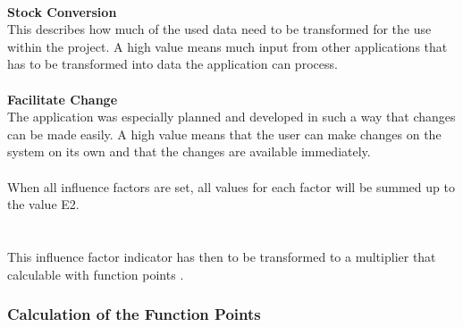 \\
\textbf{Stock Conversion}\\
This describes how much of the used data need to be transformed for the use within the project. A high value means much input from other applications that has to be transformed into data the application can process.\\
\\
\textbf{Facilitate Change}\\
The application was especially planned and developed in such a way that changes can be made easily. A high value means that the user can make changes on the system on its own and that the changes are available immediately.
\\
\\
When all influence factors are set, all values for each factor will be summed up to the value E2.\\ 

\\
\\
This influence factor indicator has then to be transformed to a multiplier that calculable with function points \cite{Softwaremanagement}\cite{fpafundamentals}.  \\

\subsubsection{Calculation of the Function Points}

